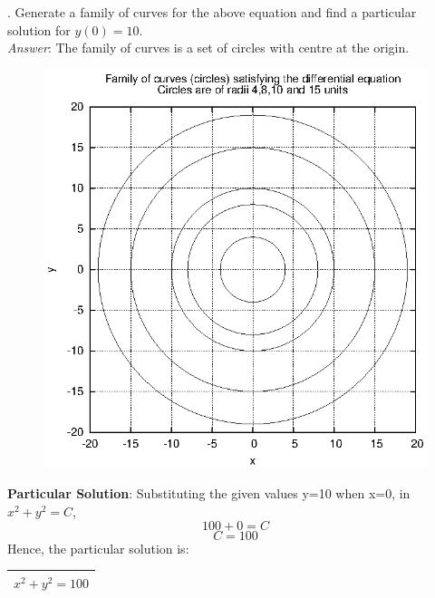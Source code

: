 \documentclass[a4paper,11pt]{article}
\begin{document}
. Generate a family of curves for the above equation and find a particular solution for $y(0) = 10$.
\\
\emph{Answer}:
The family of curves is a set of circles with centre at the origin.\\
\newpage
%
\begin{figure}[ht]
\centering
\includegraphics{circ}
\end{figure}
\textbf{Particular Solution}:
Substituting the given values y=10 when x=0, in $x^2+y^2=C$,
\[ 100 + 0 = C\]
\[C = 100\]
Hence, the particular solution is:
{\renewcommand{\arraystretch}{1.5}
\begin{tabular}{|c|}
\hline
$x^2 + y^2 = 100$\\
\hline
\end{tabular}}\\
\end{document}
